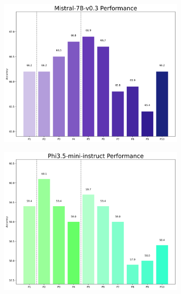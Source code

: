 \documentclass[11pt]{article}
\begin{document}
\begin{figure}[h]
    \begin{subfigure}[b]{0.3\linewidth}
        \centering
        \includegraphics[width=\linewidth]{picture/figure4_mistral.png}
    \end{subfigure}
    \begin{subfigure}[b]{0.3\linewidth}
        \centering
        \includegraphics[width=\linewidth]{picture/figure4_phi.png}
    \end{subfigure}
    \begin{subfigure}[b]{0.3\linewidth}
        \centering

\end{subfigure}
\end{figure}
\end{document}
